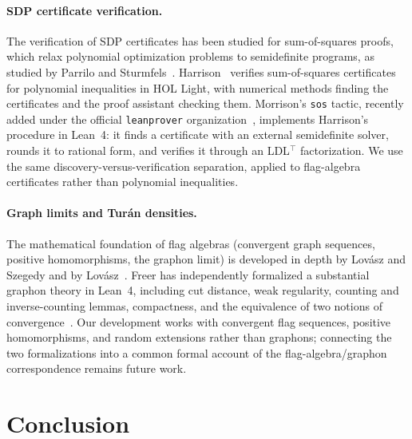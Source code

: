 \documentclass{article}
\newcommand{\lean}[1]{\texttt{#1}}
\begin{document}
\paragraph{SDP certificate verification.}
The verification of SDP certificates has been studied for sum-of-squares
proofs, which relax polynomial optimization problems to semidefinite
programs, as studied by Parrilo and
Sturmfels~\cite{parrilo2003minimizing}.  Harrison~\cite{harrison2007verifying}
verifies sum-of-squares certificates for polynomial inequalities in HOL
Light, with numerical methods finding the certificates and the proof
assistant checking them.  Morrison's \lean{sos} tactic, recently added
under the official \lean{leanprover} organization~\cite{morrison2026sos},
implements Harrison's procedure in Lean~4: it finds a certificate with an
external semidefinite solver, rounds it to rational form, and verifies it
through an LDL$^\top$ factorization.  We use the same
discovery-versus-verification separation, applied to flag-algebra
certificates rather than polynomial inequalities.

\paragraph{Graph limits and Turán densities.}
The mathematical foundation of flag algebras (convergent graph sequences,
positive homomorphisms, the graphon limit) is developed in depth by
Lov\'asz and Szegedy and by Lov\'asz~\cite{lovasz2006limits,lovasz2012large}.
Freer has independently formalized a
substantial graphon theory in Lean~4, including cut distance, weak
regularity,
counting and inverse-counting lemmas, compactness, and the equivalence of two
notions of convergence~\cite{freer2026graphon}.  Our development works with
convergent flag sequences, positive homomorphisms, and random extensions
rather than graphons; connecting the two formalizations into a common formal
account of the flag-algebra/graphon correspondence remains future work.

\section{Conclusion}
\label{sec:conclusion}
\end{document}
